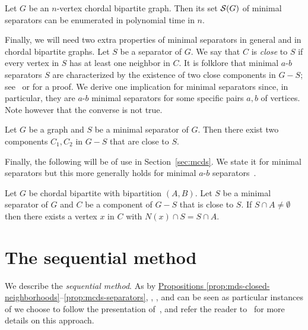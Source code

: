 \begin{proposition}\label{prop:chbip-sep-enum}
    Let $G$ be an $n$-vertex chordal bipartite graph. Then its set $\S(G)$ of minimal separators can be enumerated in polynomial time in $n$.
\end{proposition}

Finally, we will need two extra properties of minimal separators in general and in chordal bipartite graphs.
Let \(S\) be a separator of \(G\). We say that \(C\) is \emph{close} to \(S\) if every vertex in \(S\) has at least one neighbor in \(C\).
It is folklore that minimal $a$-$b$ separators $S$ are characterized by the existence of two close components in $G-S$; see~\cite{shen1997efficient,golumbic2004algorithmic,kloks2011feedback} or \cite{kloks1994finding} for a proof.
We derive one implication for minimal separators since, in particular, they are $a$-$b$ minimal separators for some specific pairs $a,b$ of vertices. 
Note however that the converse is not true.

\begin{proposition}\label{prop:close}
    Let $G$ be a graph and $S$ be a minimal separator of $G$.
    Then there exist two components $C_1,C_2$ in $G-S$ that are close to $S$.
\end{proposition}

Finally, the following will be of use in Section~\ref{sec:mcds}. We state it for minimal separators but this more generally holds for minimal $a$-$b$ separators~\cite{kloks2011feedback}.

\begin{proposition}\label{prop:close-neighbor}
Let $G$ be chordal bipartite with bipartition $(A,B)$. Let $S$ be a minimal separator of $G$ and $C$ be a component of $G-S$ that is close to $S$. 
If $S\cap A\neq\emptyset$ then there exists a vertex $x$ in $C$ with
$N(x) \cap S = S \cap A$. 
\end{proposition}

\section{The sequential method}\label{sec:sequential-approach}

We describe the \emph{sequential method}.
As by \hyperref[prop:mds-closed-neighborhoods]{Propositions \ref*{prop:mds-closed-neighborhoods}}--\ref{prop:mcds-separators}, %
\domenum{}, \tdomenum{}, and \cdomenum{} can be seen as particular instances of \transenum{} we choose to follow the presentation of~\cite{bartier2024hypergraph}, and refer the reader to~\cite{eiter2003new,elbassioni2008some,bonamy2020kt} for more details on this approach.

